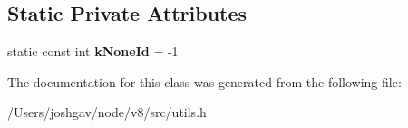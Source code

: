 \subsection*{Static Private Attributes}
\begin{DoxyCompactItemize}
\item 
static const int {\bfseries k\+None\+Id} = -\/1\hypertarget{classv8_1_1internal_1_1_type_feedback_id_ad70eb78c7720ed6ffc58854951d59838}{}\label{classv8_1_1internal_1_1_type_feedback_id_ad70eb78c7720ed6ffc58854951d59838}

\end{DoxyCompactItemize}


The documentation for this class was generated from the following file\+:\begin{DoxyCompactItemize}
\item 
/\+Users/joshgav/node/v8/src/utils.\+h\end{DoxyCompactItemize}
